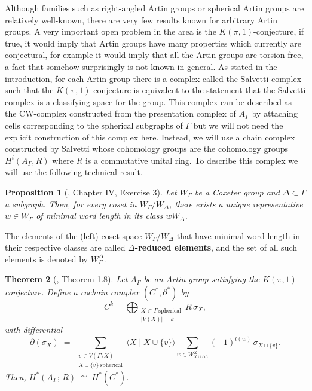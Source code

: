 \documentclass[10pt, oneside]{amsart}
\newtheorem{theorem}{Theorem}[section]
\newtheorem{proposition}[theorem]{Proposition}
\theoremstyle{definition}
\theoremstyle{remark}
\theoremstyle{plain}
\begin{document}
Although families such as right-angled Artin groups or spherical Artin groups are relatively well-known, there are very few results known for arbitrary Artin groups. A very important open problem in the area is the $K(\pi,1)$-conjecture, if true, it would imply that Artin groups have many properties which currently are conjectural, for example it would imply that all the Artin groups are torsion-free, a fact that somehow surprisingly is not known in general. As stated in the introduction, for each Artin group there is a complex called the Salvetti complex such that the $K(\pi,1)$-conjecture is equivalent to the statement that the Salvetti complex is a classifying space for the group. This complex can be described as the CW-complex constructed from the presentation complex of $A_\Gamma$ by attaching cells corresponding to the spherical subgraphs of $\Gamma$ but we will not need the explicit construction of this complex here. Instead, we will use a chain complex constructed by Salvetti whose cohomology groups are the cohomology groups $H^i(A_\Gamma,R)$ where $R$ is a commutative unital ring. To describe this complex we will use the following technical result.

\begin{proposition}[\cite{Bourbaki 2008}, Chapter IV, Exercise 3]
	Let $W_\Gamma$ be a Coxeter group and $\Delta\subset\Gamma$ a subgraph. Then, for every coset in $W_\Gamma/W_{\Delta}$, there exists a unique representative $w\in W_\Gamma$ of minimal word length in its class $wW_{\Delta}$.
\end{proposition}

\noindent
The elements of the (left) coset space $W_\Gamma/W_{\Delta}$ that have minimal word length in their respective classes are called \textbf{$\Delta$-reduced elements}, and the set of all such elements is denoted by $W_\Gamma^{\Delta}$.

\begin{theorem}[\cite{Salvetti 1994}, Theorem 1.8]\label{Cochaincomplex}
	Let $A_\Gamma$ be an Artin group satisfying the $K(\pi,1)$-conjecture.  
	Define a cochain complex $(C^\ast,\partial^\ast)$ by
	$$C^k = \bigoplus_{\substack{X\subset\Gamma \ \text{spherical}\\ |V(X)|=k}} R\,\sigma_X,$$
	with differential
	$$\partial(\sigma_X) \;=\; 
	\sum_{\substack{v\in V(\Gamma\setminus X) \\ X\cup\{v\}\ \text{spherical}}}
	\langle X \mid X\cup\{v\}\rangle
	\sum_{w\in W^{X}_{X\cup\{v\}}} (-1)^{l(w)}\, \sigma_{X\cup\{v\}}.$$
	Then, $H^\ast(A_\Gamma;\,R) \;\cong\; H^\ast(C^\ast)$.
\end{theorem}
\end{document}

